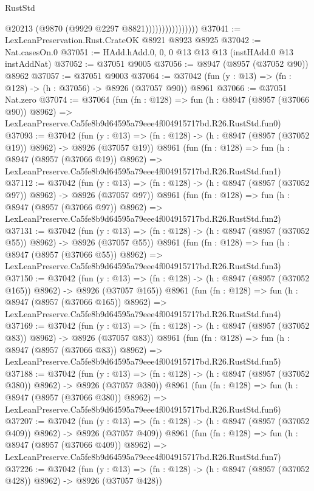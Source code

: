 \begin{lexlean}{RustStd}
\begin{coremodule}
                                @20213
                                (@9870 (@9929 @2297 @8821))))))))))))))))
@37041 := LexLeanPreservation.Rust.CrateOK @8921 @8923 @8925
@37042 := Nat.casesOn.{0}
@37051 := HAdd.hAdd.{0, 0, 0} @13 @13 @13 (instHAdd.{0} @13 instAddNat)
@37052 := @37051 @9005
@37056 := @8947 (@8957 (@37052 @90)) @8962
@37057 := @37051 @9003
@37064 := @37042 (fun (y : @13) => (fn : @128) -> (h : @37056) -> @8926 (@37057 @90)) @8961
@37066 := @37051 Nat.zero
@37074 := @37064
    (fun (fn : @128) =>
    fun (h : @8947 (@8957 (@37066 @90)) @8962) =>
    LexLeanPreserve.Ca5fe8b9d64595a79eee4f004915717bd.R26.RustStd.fun0)
@37093 := @37042
    (fun (y : @13) => (fn : @128) -> (h : @8947 (@8957 (@37052 @19)) @8962) -> @8926 (@37057 @19))
    @8961
    (fun (fn : @128) =>
    fun (h : @8947 (@8957 (@37066 @19)) @8962) =>
    LexLeanPreserve.Ca5fe8b9d64595a79eee4f004915717bd.R26.RustStd.fun1)
@37112 := @37042
    (fun (y : @13) => (fn : @128) -> (h : @8947 (@8957 (@37052 @97)) @8962) -> @8926 (@37057 @97))
    @8961
    (fun (fn : @128) =>
    fun (h : @8947 (@8957 (@37066 @97)) @8962) =>
    LexLeanPreserve.Ca5fe8b9d64595a79eee4f004915717bd.R26.RustStd.fun2)
@37131 := @37042
    (fun (y : @13) => (fn : @128) -> (h : @8947 (@8957 (@37052 @55)) @8962) -> @8926 (@37057 @55))
    @8961
    (fun (fn : @128) =>
    fun (h : @8947 (@8957 (@37066 @55)) @8962) =>
    LexLeanPreserve.Ca5fe8b9d64595a79eee4f004915717bd.R26.RustStd.fun3)
@37150 := @37042
    (fun (y : @13) => (fn : @128) -> (h : @8947 (@8957 (@37052 @165)) @8962) -> @8926 (@37057 @165))
    @8961
    (fun (fn : @128) =>
    fun (h : @8947 (@8957 (@37066 @165)) @8962) =>
    LexLeanPreserve.Ca5fe8b9d64595a79eee4f004915717bd.R26.RustStd.fun4)
@37169 := @37042
    (fun (y : @13) => (fn : @128) -> (h : @8947 (@8957 (@37052 @83)) @8962) -> @8926 (@37057 @83))
    @8961
    (fun (fn : @128) =>
    fun (h : @8947 (@8957 (@37066 @83)) @8962) =>
    LexLeanPreserve.Ca5fe8b9d64595a79eee4f004915717bd.R26.RustStd.fun5)
@37188 := @37042
    (fun (y : @13) => (fn : @128) -> (h : @8947 (@8957 (@37052 @380)) @8962) -> @8926 (@37057 @380))
    @8961
    (fun (fn : @128) =>
    fun (h : @8947 (@8957 (@37066 @380)) @8962) =>
    LexLeanPreserve.Ca5fe8b9d64595a79eee4f004915717bd.R26.RustStd.fun6)
@37207 := @37042
    (fun (y : @13) => (fn : @128) -> (h : @8947 (@8957 (@37052 @409)) @8962) -> @8926 (@37057 @409))
    @8961
    (fun (fn : @128) =>
    fun (h : @8947 (@8957 (@37066 @409)) @8962) =>
    LexLeanPreserve.Ca5fe8b9d64595a79eee4f004915717bd.R26.RustStd.fun7)
@37226 := @37042
    (fun (y : @13) => (fn : @128) -> (h : @8947 (@8957 (@37052 @428)) @8962) -> @8926 (@37057 @428))

\end{coremodule}
\end{lexlean}

